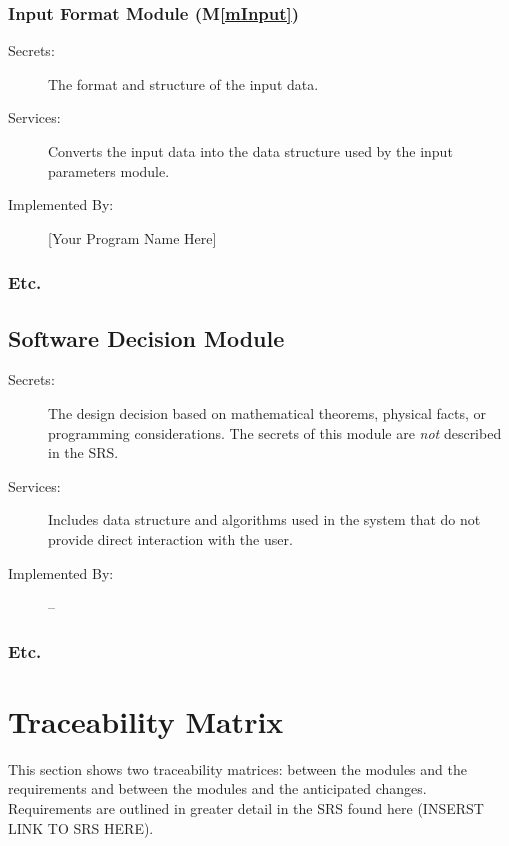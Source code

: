 \documentclass[12pt, titlepage]{article}
\newcommand{\mref}[1]{M\ref{#1}}
\begin{document}
\subsubsection{Input Format Module (\mref{mInput})}

\begin{description}
\item[Secrets:]The format and structure of the input data.
\item[Services:]Converts the input data into the data structure used by the
  input parameters module.
\item[Implemented By:] [Your Program Name Here]
\end{description}

\subsubsection{Etc.}


\subsection{Software Decision Module}

\begin{description}
\item[Secrets:] The design decision based on mathematical theorems, physical
  facts, or programming considerations. The secrets of this module are
  \emph{not} described in the SRS.
\item[Services:] Includes data structure and algorithms used in the system that
  do not provide direct interaction with the user. 
\item[Implemented By:] --
\end{description}

\subsubsection{Etc.}

\section{Traceability Matrix} \label{SecTM}

This section shows two traceability matrices: between the modules and the
requirements and between the modules and the anticipated changes. Requirements are outlined in greater detail in the SRS found here (INSERST LINK TO SRS HERE).
\end{document}
